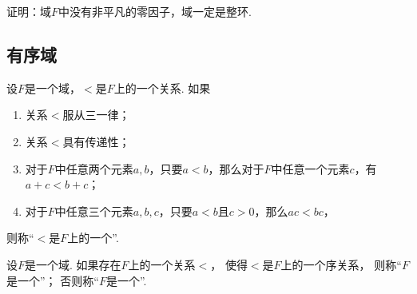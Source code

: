 %

\begin{example}
证明：域\(F\)中没有非平凡的零因子，域一定是整环.
\end{example}


\subsection{有序域}
\begin{definition}
设\(F\)是一个域，\(<\)是\(F\)上的一个关系.
如果\begin{enumerate}
	\item 关系\(<\)服从三一律；
	\item 关系\(<\)具有传递性；
	\item 对于\(F\)中任意两个元素\(a,b\)，只要\(a<b\)，那么对于\(F\)中任意一个元素\(c\)，有\(a+c<b+c\)；
	\item 对于\(F\)中任意三个元素\(a,b,c\)，只要\(a<b\)且\(c>0\)，那么\(ac<bc\)，
\end{enumerate}
则称“\(<\)是\(F\)上的一个”.
\end{definition}

\begin{definition}
设\(F\)是一个域.
如果存在\(F\)上的一个关系\(<\)，
使得\(<\)是\(F\)上的一个序关系，
则称“\(F\)是一个”；
否则称“\(F\)是一个”.
\end{definition}


